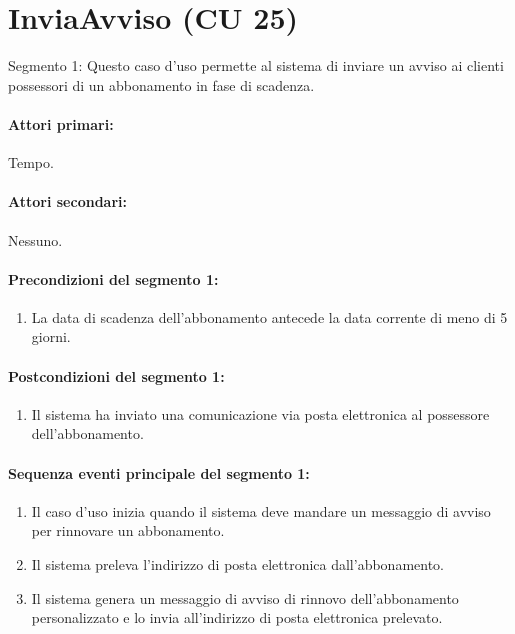 \documentclass{article}
\begin{document}
\section*{InviaAvviso (CU 25)}
	
\indent\indent Segmento 1: Questo caso d'uso permette al sistema di inviare un avviso ai clienti possessori di un abbonamento in fase di scadenza.
	
	\paragraph{Attori primari:}Tempo.
	
	\paragraph{Attori secondari:}Nessuno.
	
	\paragraph{Precondizioni del segmento 1:}
		\begin{enumerate}	[leftmargin=28pt]
			\item La data di scadenza dell’abbonamento antecede la data corrente di meno di 5 giorni.
	    	\end{enumerate}
	\paragraph{Postcondizioni del segmento 1:} 
		\begin{enumerate}	[leftmargin=28pt]
			\item Il sistema ha inviato una comunicazione via posta elettronica al possessore dell'abbonamento.
	    	\end{enumerate}

	\paragraph{Sequenza eventi principale del segmento 1:}
		\begin{enumerate}[itemsep=8pt,parsep=0pt]
			\item Il caso d'uso inizia quando il sistema deve mandare un messaggio di avviso per rinnovare un abbonamento.
		        \item Il sistema preleva l'indirizzo di posta elettronica dall'abbonamento.
			\item Il sistema genera un messaggio di avviso di rinnovo dell'abbonamento personalizzato e lo invia all'indirizzo di posta elettronica prelevato.
             \end{enumerate}  		
	
\end{document}
